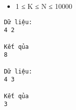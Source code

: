 \begin{itemize}
	\item     1 ≤ K ≤  N ≤ 10000   
\end{itemize}
\begin{verbatim}
Dữ liệu:
4 2

Kết qủa
8

Dữ liệu:
4 3

Kết qủa
3
\end{verbatim}